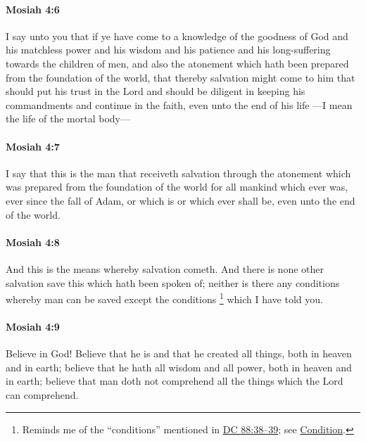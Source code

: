 		\paragraph{Mosiah 4:6} %
			\label{MOSIAH-4-6}

			I say unto you that
			if ye have come to a knowledge of the goodness of God
			and his matchless power and his wisdom and his patience
			and his long-suffering towards the children of men,
			and also the atonement which hath been prepared
			from the foundation of the world,
			that thereby salvation might come to him
			that should put his trust in the Lord
			and should be diligent in keeping his commandments
			and continue in the faith, even unto the end of his life
			---I mean the life of the mortal body---

		\paragraph{Mosiah 4:7} %
			\label{MOSIAH-4-7}

			I say that this is the man that receiveth salvation
			through the atonement which was prepared from the foundation of the world
			for all mankind which ever was, ever since the fall of Adam,
			or which is or which ever shall be, even unto the end of the world.

		\paragraph{Mosiah 4:8} %
			\label{MOSIAH-4-8}

			And this is the means whereby salvation cometh.
			And there is none other salvation save this which hath been spoken of;
			neither is there any conditions whereby man can be saved
			except the conditions%
				\footnote{%
					\label{MOSIAH-4-8-NOTE-conditions}%
					Reminds me of the ``conditions'' mentioned in \hyperref[DC88-38]{DC 88:38--39}; see \hyperref[CONDITION]{Condition}.
					}
			which I have told you.

		\paragraph{Mosiah 4:9} %
			\label{MOSIAH-4-9}

			Believe in God!
			Believe that he is and that he created all things, both in heaven and in earth;
			believe that he hath all wisdom and all power, both in heaven and in earth;
			believe that man doth not comprehend all the things
			which the Lord can comprehend.

